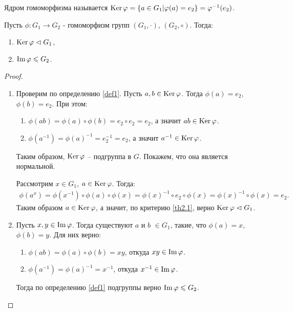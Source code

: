 
\begin{definition}
    \label{def2.5}
    Ядром гомоморфизма называется $\operatorname{Ker} \varphi = \{a \in G_1 | \varphi(a) = e_2\} = \varphi^{-1}(e_2)$.
\end{definition}

\begin{proposition}
    \label{pr3.1}
    Пусть $\phi: G_1 \to G_2$ - гомоморфизм групп $(G_1, \cdot)$, $(G_2, \circ)$. Тогда:
    \begin{enumerate}
        \item $\operatorname{Ker} \varphi \vartriangleleft G_1$,
        \item $\operatorname{Im} \varphi \leqslant G_2$.
    \end{enumerate}
\end{proposition}

\begin{proof}~
    \begin{enumerate}
        \item Проверим по определению \ref{def1}. Пусть $a, b \in \operatorname{Ker} \varphi$. Тогда $\phi(a) = e_2$, 
        $\phi(b) = e_2$. При этом:
        \begin{enumerate}
            \item $\phi(ab) = \phi(a) \circ \phi(b) = e_2 \circ e_2 = e_2$, а значит $ab \in \operatorname{Ker} \varphi$.
            \item $\phi(a^{-1}) = \phi(a)^{-1} = e_2^{-1} = e_2$, а значит $a^{-1} \in \operatorname{Ker} \varphi$.
        \end{enumerate}
        Таким образом, $\operatorname{Ker} \varphi$ -- подгруппа в $G$. Покажем, что она является нормальной.

        Рассмотрим $x \in G_1$, $a \in \operatorname{Ker} \varphi$. Тогда:
        \begin{gather*}
            \phi(a^x) = \phi(x^{-1}) \circ \phi(a) \circ \phi(x) = \phi(x)^{-1} \circ e_2 \circ \phi(x) = 
            \phi(x)^{-1} \circ \phi(x) = e_2.
        \end{gather*}
        Таким образом $a \in \operatorname{Ker} \varphi$, а значит, по критерию \ref{th2.1}, 
        верно $\operatorname{Ker} \varphi \vartriangleleft G_1$.
        \item Пусть $x, y \in \operatorname{Im} \varphi$. Тогда существуют $a$ и $b$ $\in G_1$, такие, что $\phi(a) = x$, 
        $\phi(b) = y$. Для них верно:
        \begin{enumerate}
            \item $\phi(ab) = \phi(a) \circ \phi(b) = xy$, откуда $xy \in \operatorname{Im} \varphi$.
            \item $\phi(a^{-1}) = \phi(a)^{-1} = x^{-1}$, откуда $x^{-1} \in \operatorname{Im} \varphi$.
        \end{enumerate}
        Тогда по определению \ref{def1} подгруппы верно $\operatorname{Im} \varphi \leqslant G_2$.
    \end{enumerate}
\end{proof}

